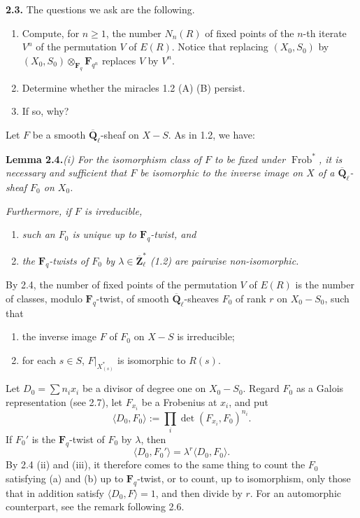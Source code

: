\documentclass[11pt]{article}
\newcommand{\Fq}{\mathbf{F}_q}
\newcommand{\Fqn}{\mathbf{F}_{q^n}}
\newcommand{\Qbl}{\overline{\mathbf{Q}}_{\ell}}
\newcommand{\Zbl}{\overline{\mathbf{Z}}_{\ell}}
\newcommand{\Frob}{\operatorname{Frob}}
\newcommand{\para}[1]{\medskip\noindent\textbf{#1}\enspace}
\begin{document}
\para{2.3.} The questions we ask are the following.
\begin{enumerate}[label=(\roman*),leftmargin=2.2em]
\item Compute, for \(n\ge 1\), the number \(N_n(R)\) of fixed points of the \(n\)-th iterate \(V^n\) of the permutation \(V\) of \(E(R)\). Notice that replacing \((X_0,S_0)\) by \((X_0,S_0)\otimes_{\Fq}\Fqn\) replaces \(V\) by \(V^n\).
\item Determine whether the miracles 1.2 (A) (B) persist.
\item If so, why?
\end{enumerate}

Let \(F\) be a smooth \(\Qbl\)-sheaf on \(X-S\). As in 1.2, we have:

\medskip
\noindent\textbf{Lemma 2.4.}\quad\textit{(i) For the isomorphism class of \(F\) to be fixed under \(\Frob^*\), it is necessary and sufficient that \(F\) be isomorphic to the inverse image on \(X\) of a \(\Qbl\)-sheaf \(F_0\) on \(X_0\).}

\noindent\textit{Furthermore, if \(F\) is irreducible,}
\begin{enumerate}[label=(\roman*),leftmargin=2.2em,start=2]
\item \textit{such an \(F_0\) is unique up to \(\Fq\)-twist, and}
\item \textit{the \(\Fq\)-twists of \(F_0\) by \(\lambda\in\Zbl^*\) (1.2) are pairwise non-isomorphic.}
\end{enumerate}

By 2.4, the number of fixed points of the permutation \(V\) of \(E(R)\) is the number of classes, modulo \(\Fq\)-twist, of smooth \(\Qbl\)-sheaves \(F_0\) of rank \(r\) on \(X_0-S_0\), such that
\begin{enumerate}[label=(\alph*),leftmargin=2.2em]
\item the inverse image \(F\) of \(F_0\) on \(X-S\) is irreducible;
\item for each \(s\in S\), \(F|_{X_{(s)}^*}\) is isomorphic to \(R(s)\).
\end{enumerate}
Let \(D_0=\sum n_i x_i\) be a divisor of degree one on \(X_0-S_0\). Regard \(F_0\) as a Galois representation (see 2.7), let \(F_{x_i}\) be a Frobenius at \(x_i\), and put
\[
\langle D_0,F_0\rangle:=\prod_i \det(F_{x_i},F_0)^{n_i}.
\]
If \(F_0'\) is the \(\Fq\)-twist of \(F_0\) by \(\lambda\), then
\[
\langle D_0,F_0'\rangle=\lambda^r\langle D_0,F_0\rangle.
\]
By 2.4 (ii) and (iii), it therefore comes to the same thing to count the \(F_0\) satisfying (a) and (b) up to \(\Fq\)-twist, or to count, up to isomorphism, only those that in addition satisfy \(\langle D_0,F\rangle=1\), and then divide by \(r\). For an automorphic counterpart, see the remark following 2.6.
\end{document}

